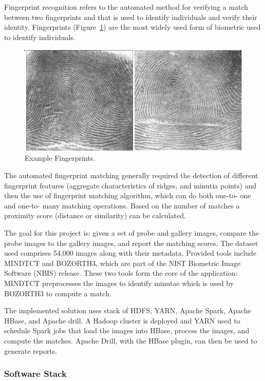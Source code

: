 \documentclass[9pt,twocolumn,twoside]{styles/osajnl}
\begin{document}
\begin{table}[htb]
Fingerprint recognition refers to the automated method for verifying a
match between two fingerprints and that is used to identify
individuals and verify their identity. Fingerprints
(Figure~\ref{F:NIST-fingerprints}) are the most widely used form of
biometric used to identify individuals.



\begin{figure}[htb]
  \centering
      \includegraphics[width=0.9\columnwidth]{images/fingerprints}
  \caption{Example Fingerprints.}
  \label{F:NIST-fingerprints}
\end{figure}



The automated fingerprint matching generally required the detection of
different fingerprint features (aggregate characteristics of ridges,
and minutia points) and then the use of fingerprint matching
algorithm, which can do both one-to- one and one-to- many matching
operations. Based on the number of matches a proximity score (distance
or similarity) can be calculated.


The goal for this project is: given a set of probe and gallery images,
compare the probe images to the gallery images, and report the
matching scores.  The dataset used comprises 54,000 images along with
their metadata. Provided tools include MINDTCT and BOZORTH3, which are
part of the NIST Biometric Image Software (NBIS) release. These two
tools form the core of the application: MINDTCT preprocesses the
images to identify minutae which is used by BOZORTH3 to compute a
match.


The implemented solution uses stack of HDFS, YARN, Apache Spark,
Apache HBase, and Apache drill. A Hadoop cluster is deployed and YARN
used to schedule Spark jobs that load the images into HBase, process
the images, and compute the matches. Apache Drill, with the HBase
plugin, can then be used to generate reports.

\subsubsection{Software Stack}


\end{table}
\end{document}
